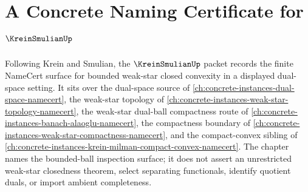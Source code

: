 \chapter{A Concrete Naming Certificate for $\KreinSmulianUp$}
\label{ch:concrete-instances-krein-smulian-namecert}

Following Krein and Smulian, the $\KreinSmulianUp$ packet records the finite NameCert surface for bounded weak-star closed convexity in a displayed dual-space setting. It sits over the dual-space source of \autoref{ch:concrete-instances-dual-space-namecert}, the weak-star topology of \autoref{ch:concrete-instances-weak-star-topology-namecert}, the weak-star dual-ball compactness route of \autoref{ch:concrete-instances-banach-alaoglu-namecert}, the compactness boundary of \autoref{ch:concrete-instances-weak-star-compactness-namecert}, and the compact-convex sibling of \autoref{ch:concrete-instances-krein-milman-compact-convex-namecert}. The chapter names the bounded-ball inspection surface; it does not assert an unrestricted weak-star closedness theorem, select separating functionals, identify quotient duals, or import ambient completeness.


